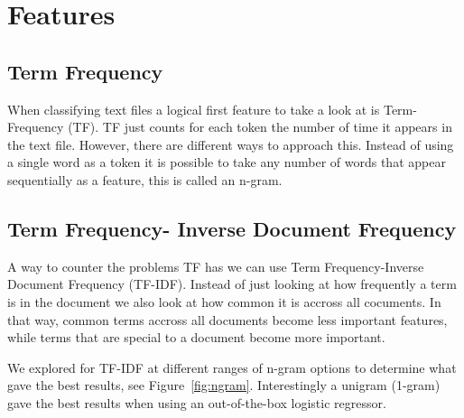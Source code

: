 \section{Features}

\subsection{Term Frequency}

When classifying text files a logical first feature to take a look at is Term-Frequency (TF).
TF just counts for each token the number of time it appears in the text file.
However, there are different ways to approach this. 
Instead of using a single word as a token it is possible to take any number of words that appear sequentially  as a feature, this is called an n-gram.

\subsection{Term Frequency- Inverse Document Frequency}

A way to counter the problems TF has we can use Term Frequency-Inverse Document Frequency (TF-IDF).
Instead of just looking at how frequently a term is in the document we also look at how common it is accross all cocuments.
In that way, common terms accross all documents become less important features, while terms that are special to a document become more important.

We explored for TF-IDF at different ranges of n-gram options to determine what gave the best results, see Figure~\ref{fig:ngram}.
Interestingly a unigram (1-gram) gave the best results when using an out-of-the-box logistic regressor. 


